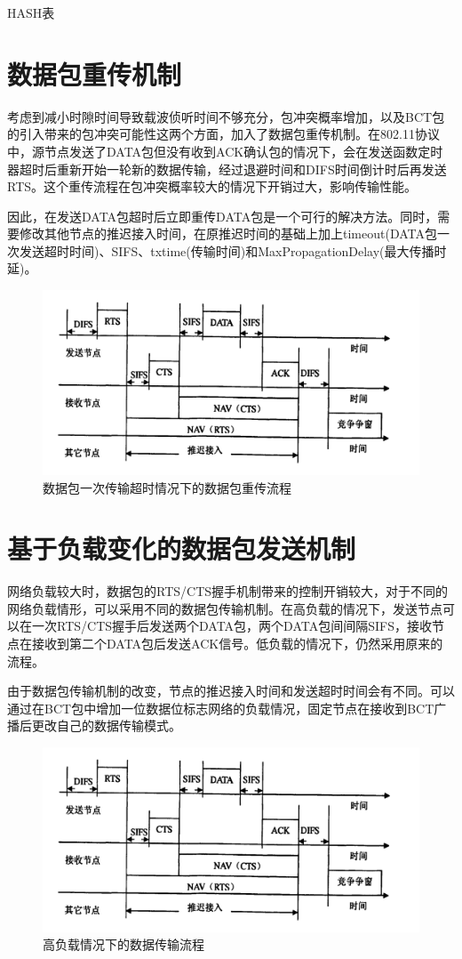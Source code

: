 HASH表

\section {数据包重传机制}
考虑到减小时隙时间导致载波侦听时间不够充分，包冲突概率增加，以及BCT包的引入带来的包冲突可能性这两个方面，加入了数据包重传机制。在802.11协议中，源节点发送了DATA包但没有收到ACK确认包的情况下，会在发送函数定时器超时后重新开始一轮新的数据传输，经过退避时间和DIFS时间倒计时后再发送RTS。这个重传流程在包冲突概率较大的情况下开销过大，影响传输性能。

因此，在发送DATA包超时后立即重传DATA包是一个可行的解决方法。同时，需要修改其他节点的推迟接入时间，在原推迟时间的基础上加上timeout(DATA包一次发送超时时间)、SIFS、txtime(传输时间)和MaxPropagationDelay(最大传播时延)。

\begin{figure}[ht]
	\centering
	\includegraphics[scale=0.2]{figures/RC.png}
	\caption{
	     数据包一次传输超时情况下的数据包重传流程
	}
	\label{fig:example}
\end{figure}

\section {基于负载变化的数据包发送机制}
网络负载较大时，数据包的RTS/CTS握手机制带来的控制开销较大，对于不同的网络负载情形，可以采用不同的数据包传输机制。在高负载的情况下，发送节点可以在一次RTS/CTS握手后发送两个DATA包，两个DATA包间间隔SIFS，接收节点在接收到第二个DATA包后发送ACK信号。低负载的情况下，仍然采用原来的流程。

由于数据包传输机制的改变，节点的推迟接入时间和发送超时时间会有不同。可以通过在BCT包中增加一位数据位标志网络的负载情况，固定节点在接收到BCT广播后更改自己的数据传输模式。
\begin{figure}[ht]
	\centering
	\includegraphics[scale=0.2]{figures/RC.png}
	\caption{
		高负载情况下的数据传输流程
	}
	\label{fig:example}
\end{figure}



\endinput